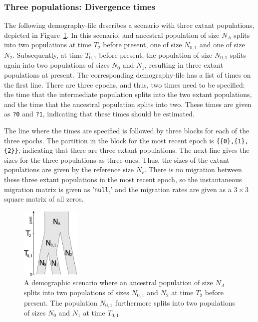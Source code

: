 \documentclass{article}
\numberwithin{equation}{section}
\begin{document}
\subsubsection{Three populations: Divergence times}
\label{sec_demo_three_populations}


The following demography-file describes a scenario with three extant populations, depicted in Figure~\ref{fig_three_pop}. In this scenario, and ancestral population of size $N_A$ splits into two populations at time $T_2$ before present, one of size $N_{0,1}$ and one of size $N_2$. Subsequently, at time $T_{0,1}$ before present, the population of size $N_{0,1}$ splits again into two populations of sizes $N_0$ and $N_1$, resulting in three extant populations at present. The corresponding demography-file has a list of times on the first line. There are three epochs, and thus, two times need to be specified: the time that the intermediate population splits into the two extant populations, and the time that the ancestral population splits into two. These times are given as \texttt{?0} and \texttt{?1}, indicating that these times should be estimated.

The line where the times are specified is followed by three blocks for each of the three epochs. The partition in the block for the most recent epoch is \texttt{\{\{0\},\{1\},\{2\}\}}, indicating that there are three extant populations. The next line gives the sizes for the three populations as three ones. Thus, the sizes of the extant populations are given by the reference size $N_r$. There is no migration between these three extant populations in the most recent epoch, so the instantaneous migration matrix is given as '\texttt{null},' and the migration rates are given as a $3 \times 3$ square matrix of all zeros.

\begin{figure}
  \begin{center}
    \includegraphics[width=0.25\textwidth]{graphics/threePop.pdf}
  \end{center} 
  \caption{A demographic scenario where an ancestral population of size $N_A$ splits into two populations of sizes $N_{0,1}$ and $N_2$ at time $T_2$ before present. The population $N_{0,1}$ furthermore splits into two populations of sizes $N_0$ and $N_1$ at time $T_{0,1}$.}
  \label{fig_three_pop}
\end{figure}
\end{document}
